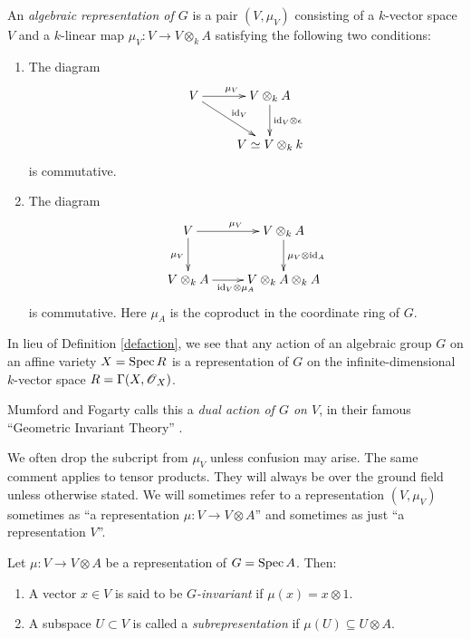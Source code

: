\documentclass[11pt, english]{article}
\begin{document}
\begin{defi}
 An \emph{algebraic representation of $G$} is a pair $(V,\mu_V)$ consisting of a $k$-vector space $V$ and a $k$-linear map $\mu_V: V \to V \otimes_k A$ satisfying the following two conditions:
 \begin{enumerate}
 \item The diagram
\begin{equation}
\label{eq:algrep1}
\xymatrix{
V \ar[dr]^{\id_V} \ar[r]^{\mu_V} & V \otimes_k A \ar[d]^{\id_V \otimes \epsilon} \\
 & V \simeq V \otimes_k k
}
\end{equation}
is commutative.
\item The diagram
\[
\xymatrix{
V \ar[r]^{\mu_V} \ar[d]_{\mu_V} & V \otimes_k A \ar[d]^{\mu_V \otimes \id_A} \\
V \otimes_k A \ar[r]_{\id_V \otimes \mu_A} & V \otimes _k A \otimes_k A
}
\]
is commutative. Here $\mu_A$ is the coproduct in the coordinate ring of $G$.
 \end{enumerate}
\end{defi}

\begin{remark}
In lieu of Definition \ref{defaction}, we see that any action of an algebraic group $G$ on an affine variety $X=\operatorname{Spec} R$ is a representation of $G$ on the infinite-dimensional $k$-vector space $R=\Gamma(X,\operatorname{\mathscr{O}}_X)$.
\end{remark}

\begin{remark}
Mumford and Fogarty calls this a \emph{dual action of $G$ on $V$}, in their famous ``Geometric Invariant Theory'' \cite{mumford_git}.
\end{remark}

We often drop the subcript from $\mu_V$ unless confusion may arise. The same comment applies to tensor products. They will always be over the ground field unless otherwise stated. We will sometimes refer to a representation $(V,\mu_V)$ sometimes as ``a representation $\mu:V \to V \otimes A$'' and sometimes as just ``a representation $V$''.

\begin{defi}
Let $\mu:V \to V \otimes A$ be a representation of $G = \operatorname{Spec} A$. Then:
\begin{enumerate}
\item A vector $x \in V$ is said to be \emph{$G$-invariant} if $\mu(x) = x \otimes 1$.
\item A subspace $U \subset V$ is called a \emph{subrepresentation} if $\mu(U) \subseteq U \otimes A$. 
\end{enumerate}
\end{defi}
\end{document}
